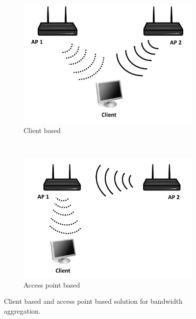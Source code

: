 
\begin{figure}[tb]
    \centering
    \begin{subfigure}[t]{0.5\textwidth}
        \centering
        \includegraphics[width=.9\textwidth]{aggregation/background/figures/aggr_client_sw}
        \caption{Client based}
				\label{fig:aggregation:background:aggrclient}
    \end{subfigure}%
    ~
    \begin{subfigure}[t]{0.5\textwidth}
        \centering
        \includegraphics[width=.9\textwidth]{aggregation/background/figures/aggr_ap_sw}
        \caption{Access point based}
				\label{fig:aggregation:background:aggrap}
    \end{subfigure}
    \caption{Client based and access point based solution for bandwidth aggregation.}
		\label{fig:aggregation:background:aggr}
\end{figure}

